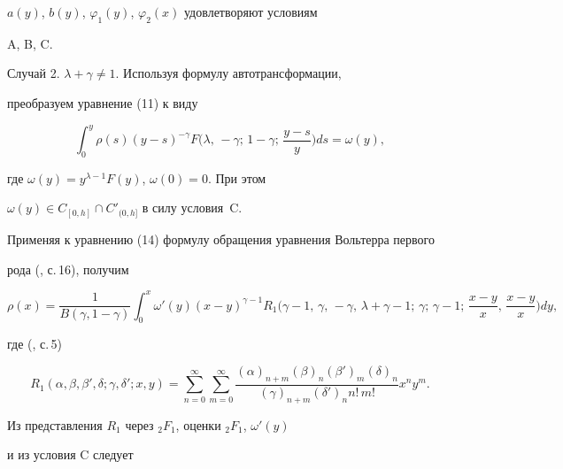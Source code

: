 $a(y)$, $b(y)$, $\varphi_1(y)$, $\varphi_2(x)$ удовлетворяют условиям 


A, B, C. 


\medskip 


 


Случай 2. $\lambda+\gamma\ne1$. Используя формулу автотрансформации, 


преобразуем уравнение (11) к виду 


\begin{equation} 


\int^y_0 \rho(s)(y-s)^{-\gamma}F\bigg(\lambda,\,-\gamma;\,1-\gamma;\, 


\frac{y-s}{y}\bigg)ds=\omega(y), 


\end{equation} 


где $\omega(y)=y^{\lambda-1}F(y)$, $\omega(0)=0$. При этом 


$\omega(y)\in C_{[0,h]}\cap C'_{(0,h]}$ в силу условия~C. 


Применяя к уравнению (14) формулу обращения уравнения Вольтерра первого 


рода (\cite{4}, с.\,16), получим 


\begin{equation} 


\rho(x)=\frac{1}{B(\gamma,1-\gamma)}\int^x_0 


\omega'(y)(x-y)^{\gamma-1}R_1\bigg(\gamma-1,\,\gamma,\,-\gamma,\, 


\lambda+\gamma-1;\,\gamma;\,\gamma-1;\, 


\frac{x-y}{x},\,\frac{x-y}{x}\bigg)dy, 


\end{equation} 


где (\cite{4}, с.\,5) 


$$ 


R_1(\alpha,\beta,\beta',\delta;\gamma,\delta';x,y)= 


\sum^\infty_{n=0}\sum^\infty_{m=0} 


\frac{(\alpha)_{n+m}(\beta)_n(\beta')_m(\delta)_n} 


{(\gamma)_{n+m}(\delta')_n n!\,m!}x^n y^m. 


$$ 


 


Из представления $R_1$ через ${}_2F_1$, оценки ${}_2F_1$, $\omega'(y)$ 


и из условия C следует 


